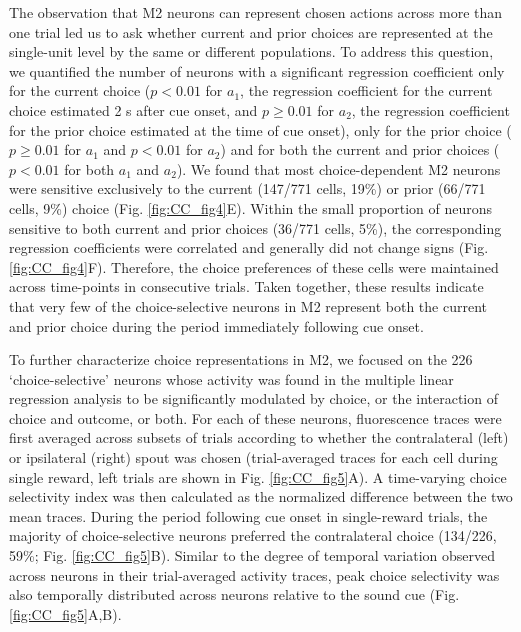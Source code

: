 The observation that M2 neurons can represent chosen actions across more than one trial led us to ask whether current and prior choices are represented at the single-unit level by the same or different populations. To address this question, we quantified the number of neurons with a significant regression coefficient only for the current choice ($p < 0.01$ for $a_1$, the regression coefficient for the current choice estimated 2 s after cue onset, and $p \geq 0.01$ for $a_2$, the regression coefficient for the prior choice estimated at the time of cue onset), only for the prior choice ($p \geq 0.01$ for $a_1$ and $p < 0.01$ for $a_2$) and for both the current and prior choices ($p < 0.01$ for both $a_1$ and $a_2$). We found that most choice-dependent M2 neurons were sensitive exclusively to the current (147/771 cells, 19\%) or prior (66/771 cells, 9\%) choice (Fig. \ref{fig:CC_fig4}E). Within the small proportion of neurons sensitive to both current and prior choices (36/771 cells, 5\%), the corresponding regression coefficients were correlated and generally did not change signs (Fig. \ref{fig:CC_fig4}F). Therefore, the choice preferences of these cells were maintained across time-points in consecutive trials. Taken together, these results indicate that very few of the choice-selective neurons in M2 represent both the current and prior choice during the period immediately following cue onset.

To further characterize choice representations in M2, we focused on the 226 ‘choice-selective’ neurons whose activity was found in the multiple linear regression analysis to be significantly modulated by choice, or the interaction of choice and outcome, or both. For each of these neurons, fluorescence traces were first averaged across subsets of trials according to whether the contralateral (left) or ipsilateral (right) spout was chosen (trial-averaged traces for each cell during single reward, left trials are shown in Fig. \ref{fig:CC_fig5}A). A time-varying choice selectivity index was then calculated as the normalized difference between the two mean traces. During the period following cue onset in single-reward trials, the majority of choice-selective neurons preferred the contralateral choice (134/226, 59\%; Fig. \ref{fig:CC_fig5}B). Similar to the degree of temporal variation observed across neurons in their trial-averaged activity traces, peak choice selectivity was also temporally distributed across neurons relative to the sound cue (Fig. \ref{fig:CC_fig5}A,B).

